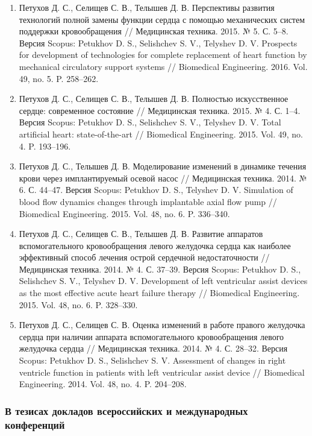 \begin{enumerate}[leftmargin=25pt, itemsep=12pt]
  \item Петухов Д. С., Селищев С. В., Телышев Д. В. Перспективы развития технологий полной замены функции сердца с помощью механических систем поддержки кровообращения // Медицинская техника. 2015. № 5. С. 5--8. Версия Scopus: \textcolor{bib3}{Petukhov D. S., Selishchev S. V., Telyshev D. V. Prospects for development of technologies for complete replacement of heart function by mechanical circulatory support systems // Biomedical Engineering. 2016. Vol. 49, no. 5. P. 258--262.}
  \item Петухов Д. С., Селищев С. В., Телышев Д. В. Полностью искусственное сердце: современное состояние // Медицинская техника. 2015. № 4. С. 1--4. Версия Scopus: \textcolor{bib3}{Petukhov D. S., Selishchev S. V., Telyshev D. V. Total artificial heart: state-of-the-art // Biomedical Engineering. 2015. Vol. 49, no. 4. P. 193--196.}
  \item Петухов Д. С., Телышев Д. В. Моделирование изменений в динамике течения крови через имплантируемый осевой насос // Медицинская техника. 2014. № 6. С. 44--47. Версия Scopus: \textcolor{bib3}{Petukhov D. S., Telyshev D. V. Simulation of blood flow dynamics changes through implantable axial flow pump // Biomedical Engineering. 2015. Vol. 48, no. 6. P. 336--340.}
  \item Петухов Д. С., Селищев С. В., Телышев Д. В. Развитие аппаратов вспомогательного кровообращения левого желудочка сердца как наиболее эффективный способ лечения острой сердечной недостаточности // Медицинская техника. 2014. № 4. С. 37--39. Версия Scopus: \textcolor{bib3}{Petukhov D. S., Selishchev S. V., Telyshev D. V. Development of left ventricular assist devices as the most effective acute heart failure therapy // Biomedical Engineering. 2015. Vol. 48, no. 6. P. 328--330.}
  \item Петухов Д. С., Селищев С. В. Оценка изменений в работе правого желудочка сердца при наличии аппарата вспомогательного кровообращения левого желудочка сердца // Медицинская техника. 2014. № 4. С. 28--32. Версия Scopus: \textcolor{bib3}{Petukhov D. S., Selishchev S. V. Assessment of changes in right ventricle function in patients with left ventricular assist device // Biomedical Engineering. 2014. Vol. 48, no. 4. P. 204--208.}
\end{enumerate}

\subsubsection*{В тезисах докладов всероссийских и международных конференций}

